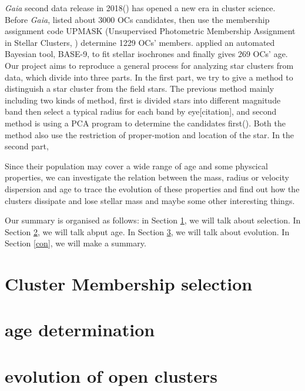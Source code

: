 \documentclass[modern]{aastex63}
\begin{document}
\emph{Gaia} second data release in 2018(\cite{2018A&A...616A..12G}) has opened a new era in cluster science. Before \emph{Gaia}, \cite{2013A&A...558A..53K} listed about 3000 OCs candidates, then \cite{2018A&A...618A..93C} use the membership assignment code
UPMASK (Unsupervised Photometric Membership Assignment in Stellar Clusters, \cite{2014A&A...561A..57K}) determine 1229 OCs' members. \cite{2019A&A...623A.108B} applied an automated Bayesian tool, BASE-9, to fit stellar isochrones and finally gives 269 OCs' age. Our project aims to reproduce a general process for analyzing star clusters from data, which divide into three parts. 
In the first part, we try to give a method to distinguish a star cluster from the field stars. The previous method mainly including two kinds of method, first is divided stars into different magnitude band then select a typical radius for each band by eye[citation], and second method is using a PCA program to determine the candidates first(\cite{2018A&A...618A..93C}). Both the method also use the restriction of proper-motion and location of the star. 
In the second part,  

Since their population may cover a wide range of age and some physcical properties, we can investigate the relation between the mass, radius or velocity dispersion and age to trace the evolution of these properties and find out how the clusters dissipate and lose stellar mass and maybe some other interesting things.

Our summary is organised as follows: in Section \ref{selection}, we will talk about selection. In Section \ref{age}, we will talk abput age. In Section \ref{evolution}, we will talk about evolution. In Section \ref{con}, we will make a summary.

\bigskip
\bigskip
\section{Cluster Membership selection}\label{selection}






\bigskip
\bigskip
\section{age determination}\label{age}




\bigskip
\bigskip
\section{evolution of open clusters}\label{evolution}
\end{document}
